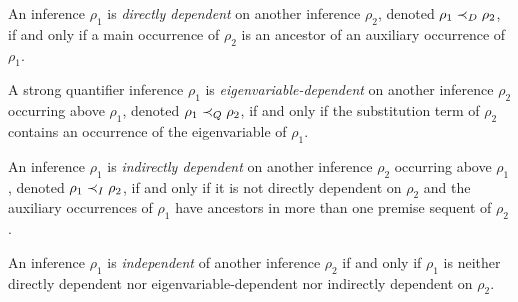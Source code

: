 \documentclass{llncs}
\begin{document}
\begin{definition}
\label{definition:InferenceDependence}
An inference $\rho_1$ is \emph{directly dependent} on another inference $\rho_2$, denoted $\rho_1 \prec_D \rho_2$, if and only if a main occurrence of $\rho_2$ is an ancestor of an auxiliary occurrence of $\rho_1$. 

A strong quantifier inference $\rho_1$ is \emph{eigenvariable-dependent} on another inference $\rho_2$ occurring above $\rho_1$, denoted $\rho_1 \prec_Q \rho_2$, if and only if the substitution term of $\rho_2$ contains an occurrence of the eigenvariable of $\rho_1$.

An inference $\rho_1$ is \emph{indirectly dependent} on another inference $\rho_2$ occurring above $\rho_1$, denoted $\rho_1 \prec_I \rho_2$, if and only if it is not directly dependent on $\rho_2$ and the auxiliary occurrences of $\rho_1$ have ancestors in more than one premise sequent of $\rho_2$.

An inference $\rho_1$ is \emph{independent} of another inference $\rho_2$ if and only if $\rho_1$ is neither directly dependent nor eigenvariable-dependent nor indirectly dependent on $\rho_2$. 
\end{definition}
\end{document}
